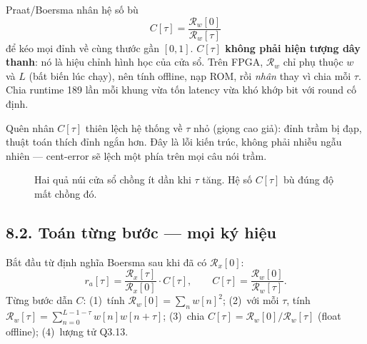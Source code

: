 Praat/Boersma nhân hệ số bù
\[
C[\tau] = \frac{\mathcal{R}_w[0]}{\mathcal{R}_w[\tau]}
\]
để kéo mọi đỉnh về cùng thước gần $[0,1]$. \textbf{$C[\tau]$ không phải hiện tượng dây thanh}: nó là hiệu chỉnh hình học của cửa sổ. Trên FPGA, $\mathcal{R}_w$ chỉ phụ thuộc $w$ và $L$ (bất biến lúc chạy), nên tính offline, nạp ROM, rồi \emph{nhân} thay vì chia mỗi $\tau$. Chia runtime 189 lần mỗi khung vừa tốn latency vừa khó khớp bit với round cố định.

\begin{physicalinsight}
Quên nhân $C[\tau]$ thiên lệch hệ thống về $\tau$ nhỏ (giọng cao giả): đỉnh trầm bị đạp, thuật toán thích đỉnh ngắn hơn. Đây là lỗi kiến trúc, không phải nhiễu ngẫu nhiên --- cent-error sẽ lệch một phía trên mọi câu nói trầm.
\end{physicalinsight}

\begin{figure}[H]
\centering
{}
\caption{Hai quả núi cửa sổ chồng ít dần khi $\tau$ tăng. Hệ số $C[\tau]$ bù đúng độ mất chồng đó.}
\label{fig:ch08_window_overlap}
\end{figure}

\subsection*{8.2. Toán từng bước --- mọi ký hiệu}

Bắt đầu từ định nghĩa Boersma sau khi đã có $\mathcal{R}_x[0]$:
\[
r_a[\tau] = \frac{\mathcal{R}_x[\tau]}{\mathcal{R}_x[0]}\cdot C[\tau], \qquad
C[\tau] = \frac{\mathcal{R}_w[0]}{\mathcal{R}_w[\tau]}.
\]
Từng bước dẫn $C$: (1)~tính $\mathcal{R}_w[0]=\sum_n w[n]^2$; (2)~với mỗi $\tau$, tính $\mathcal{R}_w[\tau]=\sum_{n=0}^{L-1-\tau} w[n]w[n+\tau]$; (3)~chia $C[\tau]=\mathcal{R}_w[0]/\mathcal{R}_w[\tau]$ (float offline); (4)~lượng tử Q3.13.

